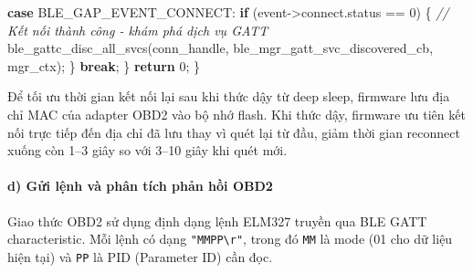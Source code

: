 \documentclass[13pt,a4paper]{extarticle}
\newenvironment{Shaded}{}{}
\newcommand{\CommentTok}[1]{\textcolor[rgb]{0.38,0.63,0.69}{\textit{#1}}}
\newcommand{\ControlFlowTok}[1]{\textcolor[rgb]{0.00,0.44,0.13}{\textbf{#1}}}
\newcommand{\DecValTok}[1]{\textcolor[rgb]{0.25,0.63,0.44}{#1}}
\newcommand{\NormalTok}[1]{#1}
\newcommand{\OperatorTok}[1]{\textcolor[rgb]{0.40,0.40,0.40}{#1}}
\renewcommand{\\}{\thesislongtableorignewline\hline}%
\begin{document}
\begin{Shaded}
\begin{Highlighting}[]
    \ControlFlowTok{case}\NormalTok{ BLE\_GAP\_EVENT\_CONNECT}\OperatorTok{:}
        \ControlFlowTok{if} \OperatorTok{(}\NormalTok{event}\OperatorTok{{-}\textgreater{}}\NormalTok{connect}\OperatorTok{.}\NormalTok{status }\OperatorTok{==} \DecValTok{0}\OperatorTok{)} \OperatorTok{\{}
            \CommentTok{// Kết nối thành công {-} khám phá dịch vụ GATT}
\NormalTok{            ble\_gattc\_disc\_all\_svcs}\OperatorTok{(}\NormalTok{conn\_handle}\OperatorTok{,}
\NormalTok{                                     ble\_mgr\_gatt\_svc\_discovered\_cb}\OperatorTok{,}
\NormalTok{                                     mgr\_ctx}\OperatorTok{);}
        \OperatorTok{\}}
        \ControlFlowTok{break}\OperatorTok{;}
    \OperatorTok{\}}
    \ControlFlowTok{return} \DecValTok{0}\OperatorTok{;}
\OperatorTok{\}}
\end{Highlighting}
\end{Shaded}

Để tối ưu thời gian kết nối lại sau khi thức dậy từ deep sleep, firmware
lưu địa chỉ MAC của adapter OBD2 vào bộ nhớ flash. Khi thức dậy,
firmware ưu tiên kết nối trực tiếp đến địa chỉ đã lưu thay vì quét lại
từ đầu, giảm thời gian reconnect xuống còn 1--3 giây so với 3--10 giây
khi quét mới.

\paragraph{d) Gửi lệnh và phân tích phản hồi
OBD2}\label{d-gux1eedi-lux1ec7nh-vuxe0-phuxe2n-tuxedch-phux1ea3n-hux1ed3i-obd2}

Giao thức OBD2 sử dụng định dạng lệnh ELM327 truyền qua BLE GATT
characteristic. Mỗi lệnh có dạng \texttt{"MMPP\textbackslash{}r"}, trong
đó \texttt{MM} là mode (01 cho dữ liệu hiện tại) và \texttt{PP} là PID
(Parameter ID) cần đọc.
\end{document}
